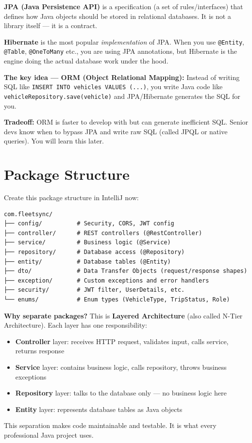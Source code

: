 \documentclass[12pt,a4paper]{report}
\newcommand{\code}[1]{\texttt{\textcolor{keywordblue}{#1}}}
\begin{document}
\begin{tcolorbox}[notebox]
\textbf{JPA (Java Persistence API)} is a specification (a set of rules/interfaces) that defines how Java objects should be stored in relational databases. It is not a library itself --- it is a contract.

\textbf{Hibernate} is the most popular \textit{implementation} of JPA. When you use \code{@Entity}, \code{@Table}, \code{@OneToMany} etc., you are using JPA annotations, but Hibernate is the engine doing the actual database work under the hood.

\textbf{The key idea --- ORM (Object Relational Mapping):} Instead of writing SQL like \code{INSERT INTO vehicles VALUES (...)}, you write Java code like \code{vehicleRepository.save(vehicle)} and JPA/Hibernate generates the SQL for you.

\textbf{Tradeoff:} ORM is faster to develop with but can generate inefficient SQL. Senior devs know when to bypass JPA and write raw SQL (called JPQL or native queries). You will learn this later.
\end{tcolorbox}

\section{Package Structure}

Create this package structure in IntelliJ now:

\begin{lstlisting}[style=bashstyle,caption=FleetSync Package Structure]
com.fleetsync/
├── config/          # Security, CORS, JWT config
├── controller/      # REST controllers (@RestController)
├── service/         # Business logic (@Service)
├── repository/      # Database access (@Repository)
├── entity/          # Database tables (@Entity)
├── dto/             # Data Transfer Objects (request/response shapes)
├── exception/       # Custom exceptions and error handlers
├── security/        # JWT filter, UserDetails, etc.
└── enums/           # Enum types (VehicleType, TripStatus, Role)
\end{lstlisting}

\begin{tcolorbox}[notebox]
\textbf{Why separate packages?} This is \textbf{Layered Architecture} (also called N-Tier Architecture). Each layer has one responsibility:
\begin{itemize}
  \item \textbf{Controller} layer: receives HTTP request, validates input, calls service, returns response
  \item \textbf{Service} layer: contains business logic, calls repository, throws business exceptions
  \item \textbf{Repository} layer: talks to the database only --- no business logic here
  \item \textbf{Entity} layer: represents database tables as Java objects
\end{itemize}
This separation makes code maintainable and testable. It is what every professional Java project uses.
\end{tcolorbox}
\end{document}
